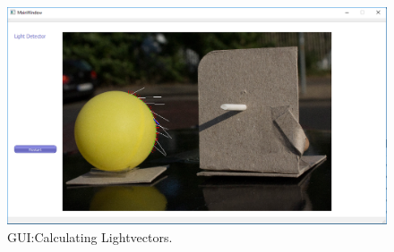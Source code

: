 \begin{figure} [H]
	\center 
	\includegraphics[width=15cm]{Images/06Gui.PNG}			
	\caption[GUI: Calculating Lightvectors.]{GUI:Calculating Lightvectors.}
	\label{fig:Gui04}
\end{figure}


\newpage

























